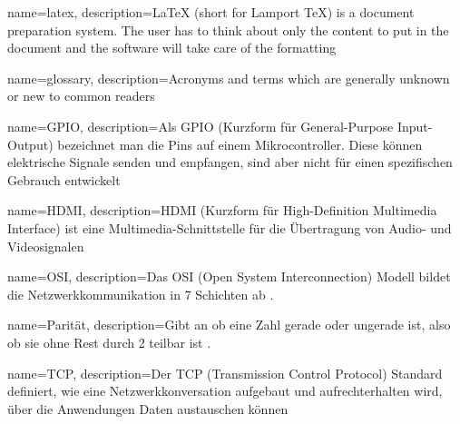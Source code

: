 











{
	name=latex,
	description={LaTeX (short for Lamport TeX) is a document preparation system. The user has to think about only the content to put in the document and the software will take care of the formatting}
}

{
	name=glossary,
	description={Acronyms and terms which are generally unknown or new to common readers}
}

{
	name=GPIO,
	description={Als GPIO (Kurzform für General-Purpose Input-Output) bezeichnet man die Pins auf einem Mikrocontroller. Diese können elektrische Signale senden und empfangen, sind aber nicht für einen spezifischen Gebrauch entwickelt}
}

{
	name=HDMI,
	description={HDMI (Kurzform für High-Definition Multimedia Interface) ist eine Multimedia-Schnittstelle für die Übertragung von Audio- und Videosignalen}
}

{
	name=OSI,
	description={Das OSI (Open System Interconnection) Modell bildet die Netzwerkkommunikation in 7 Schichten ab \cite{Schnabel_osi:o.J.}.}
}

{
	name=Parität,
	description={Gibt an ob eine Zahl gerade oder ungerade ist, also ob sie ohne Rest durch 2 teilbar ist \cite{Parity_Mathematik:o.J.}.}
}

{
	name=TCP,
	description={Der TCP (Transmission Control Protocol) Standard definiert, wie eine Netzwerkkonversation aufgebaut und aufrechterhalten wird, über die Anwendungen Daten austauschen können \cite{Lutkevich:2021}}
}

